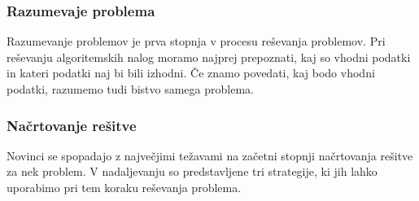 
\subsubsection{Razumevaje problema}
\label{sec:razumevanje problema}

Razumevanje problemov je prva stopnja v procesu reševanja
problemov. Pri reševanju algoritemskih nalog moramo najprej
prepoznati, kaj so vhodni podatki in kateri podatki naj bi bili
izhodni. Če znamo povedati, kaj bodo vhodni podatki, razumemo tudi
bistvo samega problema.

\subsubsection{Načrtovanje rešitve}
\label{sec:načrtovanje_rešitve}

Novinci se spopadajo z največjimi težavami na začetni stopnji
načrtovanja rešitve za nek problem. V nadaljevanju so predstavljene
tri strategije, ki jih lahko uporabimo pri tem koraku reševanja
problema.

